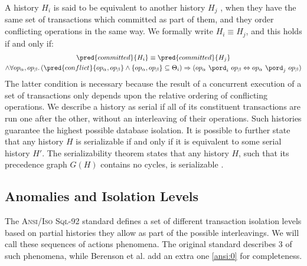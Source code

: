 A history $H_i$ is said to be equivalent to another history $H_j$ \cite{ccontrol}, when they have the same set of transactions which committed as part of them, and they order conflicting operations in the same way. We formally write $H_i \equiv H_j$, and this holds if and only if:
\begin{gather*}
	\pred{committed}{H_i} \equiv \pred{committed}{H_j} \\
	\land \forall op_\alpha, op_\beta \ldotp (\pred{conflict}{op_\alpha, op_\beta} \land \left\lbrace op_\alpha, op_\beta \right\rbrace \subseteq \Theta_i) \Rightarrow (op_\alpha\ \pord_i\ op_\beta \Leftrightarrow op_\alpha\ \pord_j\ op_\beta)
\end{gather*}
The latter condition is necessary because the result of a concurrent execution of a set of transactions only depends upon the relative ordering of conflicting operations. We describe a history as serial if all of its constituent transactions are run one after the other, without an interleaving of their operations. Such histories guarantee the highest possible database isolation. It is possible to further state that any history $H$ is serializable if and only if it is equivalent to some serial history $H'$. The serializability theorem states that any history $H$, such that its precedence graph $G(H)$ contains no cycles, is serializable \cite{ccontrol}.

\tocless\subsection{Anomalies and Isolation Levels}

The \textsc{Ansi/Iso Sql-92} standard \cite{ansi92} defines a set of different transaction isolation levels based on partial histories they allow as part of the possible interleavings. We will call these sequences of actions phenomena. The original standard describes 3 of such phenomena, while Berenson et al. \cite{isolationansi} add an extra one \ref{ansi:0} for completeness. \\

